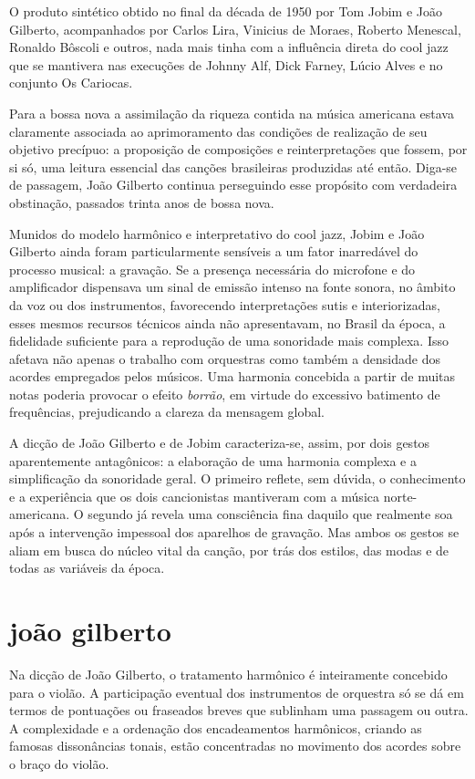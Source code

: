 O produto sintético obtido no final da década de 1950 por Tom Jobim e João
Gilberto, acompanhados por Carlos Lira, Vinicius de Moraes, Roberto
Menescal, Ronaldo Bôscoli e outros, nada mais tinha com a influência
direta do cool jazz que se mantivera nas execuções de Johnny Alf, Dick
Farney, Lúcio Alves e no conjunto Os Cariocas.

Para a bossa nova a assimilação da riqueza contida na música americana
estava claramente associada ao aprimoramento das condições de realização
de seu objetivo precípuo: a proposição de composições e reinterpretações
que fossem, por si só, uma leitura essencial das canções brasileiras
produzidas até então. Diga-se de passagem, João Gilberto continua
perseguindo esse propósito com verdadeira obstinação, passados trinta
anos de bossa nova.

Munidos do modelo harmônico e interpretativo do cool jazz, Jobim e João
Gilberto ainda foram particularmente sensíveis a um fator inarredável do
processo musical: a gravação. Se a presença necessária do microfone e do
amplificador dispensava um sinal de emissão intenso na fonte sonora, no
âmbito da voz ou dos instrumentos, favorecendo interpretações sutis e
interiorizadas, esses mesmos recursos técnicos ainda não apresentavam,
no Brasil da época, a fidelidade suficiente para a reprodução de uma
sonoridade mais complexa. Isso afetava não apenas o trabalho com
orquestras como também a densidade dos acordes empregados pelos músicos.
Uma harmonia concebida a partir de muitas notas poderia provocar o
efeito \textit{borrão}, em virtude do excessivo batimento de frequências,
prejudicando a clareza da mensagem global.

A dicção de João Gilberto e de Jobim caracteriza-se, assim, por dois
gestos aparentemente antagônicos: a elaboração de uma harmonia complexa
e a simplificação da sonoridade geral. O primeiro reflete, sem dúvida, o
conhecimento e a experiência que os dois cancionistas mantiveram com a
música norte-americana. O segundo já revela uma consciência fina daquilo
que realmente soa após a intervenção impessoal dos aparelhos de
gravação. Mas ambos os gestos se aliam em busca do núcleo vital da
canção, por trás dos estilos, das modas e de todas as variáveis da
época.

\section{joão gilberto}

Na dicção de João Gilberto, o tratamento harmônico é inteiramente
concebido para o violão. A participação eventual dos instrumentos de
orquestra só se dá em termos de pontuações ou fraseados breves que
sublinham uma passagem ou outra. A complexidade e a ordenação dos
encadeamentos harmônicos, criando as famosas dissonâncias tonais, estão
concentradas no movimento dos acordes sobre o braço do violão.

